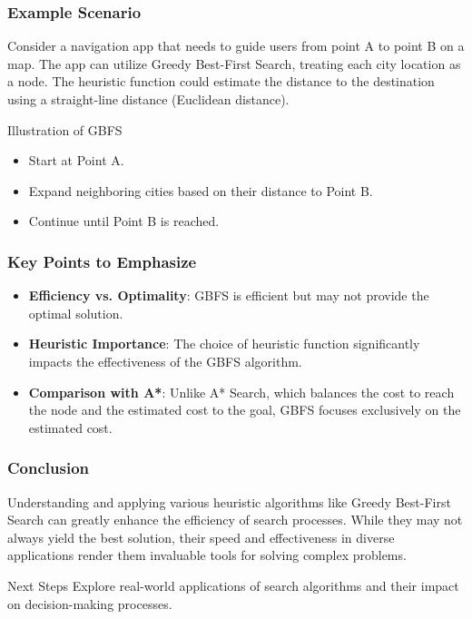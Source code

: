 \documentclass[aspectratio=169]{beamer}
\begin{document}
\begin{frame}
    \frametitle{Example Scenario}
    Consider a navigation app that needs to guide users from point A to point B on a map. The app can utilize Greedy Best-First Search, treating each city location as a node. The heuristic function could estimate the distance to the destination using a straight-line distance (Euclidean distance).

    \begin{block}{Illustration of GBFS}
        \begin{itemize}
            \item Start at Point A.
            \item Expand neighboring cities based on their distance to Point B.
            \item Continue until Point B is reached.
        \end{itemize}
    \end{block}
\end{frame}

\begin{frame}
    \frametitle{Key Points to Emphasize}
    \begin{itemize}
        \item \textbf{Efficiency vs. Optimality}: GBFS is efficient but may not provide the optimal solution.
        \item \textbf{Heuristic Importance}: The choice of heuristic function significantly impacts the effectiveness of the GBFS algorithm.
        \item \textbf{Comparison with A*}: Unlike A* Search, which balances the cost to reach the node and the estimated cost to the goal, GBFS focuses exclusively on the estimated cost.
    \end{itemize}
\end{frame}

\begin{frame}
    \frametitle{Conclusion}
    Understanding and applying various heuristic algorithms like Greedy Best-First Search can greatly enhance the efficiency of search processes. While they may not always yield the best solution, their speed and effectiveness in diverse applications render them invaluable tools for solving complex problems.
    
    \begin{block}{Next Steps}
        Explore real-world applications of search algorithms and their impact on decision-making processes.
    \end{block}
\end{frame}
\end{document}
